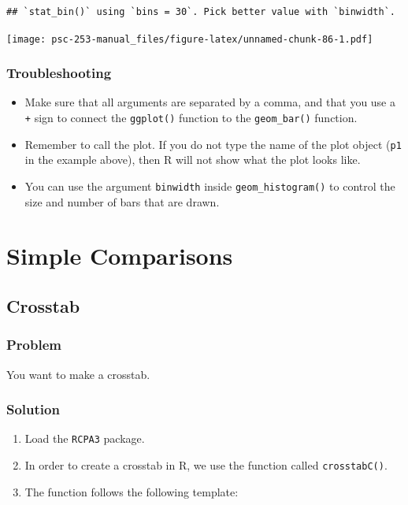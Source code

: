\documentclass[
]{book}
\providecommand{\tightlist}{%
  \setlength{\itemsep}{0pt}\setlength{\parskip}{0pt}}
\begin{document}
\begin{verbatim}
## `stat_bin()` using `bins = 30`. Pick better value with `binwidth`.
\end{verbatim}

\texttt{[image: psc-253-manual\_files/figure-latex/unnamed-chunk-86-1.pdf]}

\hypertarget{troubleshooting-33}{%
\subsection{Troubleshooting}\label{troubleshooting-33}}

\begin{itemize}
\item
  Make sure that all arguments are separated by a comma, and that you use a \texttt{+} sign to connect the \texttt{ggplot()} function to the \texttt{geom\_bar()} function.
\item
  Remember to call the plot. If you do not type the name of the plot object (\texttt{p1} in the example above), then R will not show what the plot looks like.
\item
  You can use the argument \texttt{binwidth} inside \texttt{geom\_histogram()} to control the size and number of bars that are drawn.
\end{itemize}

\hypertarget{simple-comparisons}{%
\chapter{Simple Comparisons}\label{simple-comparisons}}

\hypertarget{crosstab}{%
\section{Crosstab}\label{crosstab}}

\hypertarget{problem-38}{%
\subsection{Problem}\label{problem-38}}

You want to make a crosstab.

\hypertarget{solution-37}{%
\subsection{Solution}\label{solution-37}}

\begin{enumerate}
\def\labelenumi{\arabic{enumi}.}
\tightlist
\item
  Load the \texttt{RCPA3} package.
\item
  In order to create a crosstab in R, we use the function called \texttt{crosstabC()}.\\
\item
  The function follows the following template:
\end{enumerate}
\end{document}
